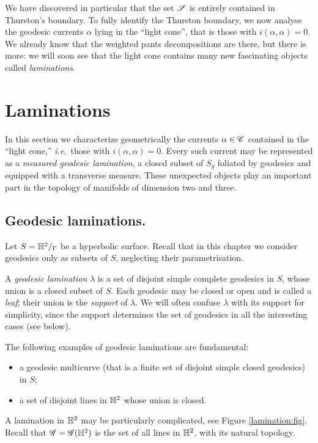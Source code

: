 We have discovered in particular that the set $\mathscr{S}$ is entirely contained in Thurston's boundary. To fully identify the Thurston boundary, we now analyse the geodesic currents $\alpha$ lying in the ``light cone'', that is those with $i(\alpha,\alpha)=0$. We already know that the weighted pants decompositions are there, but there is more: we will soon see that the light cone contains many new fascinating objects called \emph{laminations}. 

\section{Laminations}

In this section we characterize geometrically the currents $\alpha\in\mathscr{C}$ contained in the ``light cone,'' \emph{i.e.}~those with $i(\alpha,\alpha)=0$. Every such current may be represented as a \emph{measured geodesic lamination}, a closed subset of $S_g$ foliated by geodesics and equipped with a transverse measure. These unexpected objects play an important part in the topology of manifolds of dimension two and three.

\subsection{Geodesic laminations.}
Let $S = \mathbb{H}^2/_\Gamma$ be a hyperbolic surface. Recall that in this chapter we consider geodesics only as subsets of $S$, neglecting their parametrisation. 

A \emph{geodesic lamination} $\lambda$ is a set of disjoint simple complete geodesics in $S$, whose union is a closed subset of $S$. Each geodesic may be closed or open and is called a \emph{leaf}; their union is the \emph{support} of $\lambda$. We will often confuse $\lambda$ with its support for simplicity, since the support determines the set of geodesics in all the interesting cases (see below).

The following examples of geodesic laminations are fundamental:
\begin{itemize}
\item a geodesic multicurve (that is a finite set of disjoint simple closed geodesics) in $S$;
\item a set of disjoint lines in $\mathbb{H}^2$ whose union is closed. 
\end{itemize}

A lamination in $\mathbb{H}^2$ may be particularly complicated, see Figure \ref{lamination:fig}. Recall that $\mathscr{G} = \mathscr{G}(\mathbb{H}^2)$ is the set of all lines in $\mathbb{H}^2$, with its natural topology.

